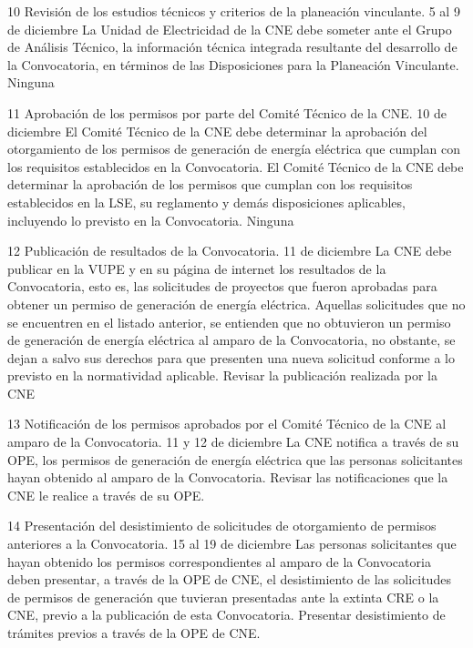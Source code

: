  10
 Revisión de los estudios técnicos y criterios de la planeación vinculante.
 5 al 9 de diciembre
 La Unidad de Electricidad de la CNE debe someter ante el Grupo de Análisis Técnico, la información técnica integrada resultante del desarrollo de la Convocatoria, en términos de las Disposiciones para la Planeación Vinculante.
 Ninguna
 
 \par
11
 Aprobación de los permisos por parte del Comité Técnico de la CNE.
 10 de diciembre
 El Comité Técnico de la CNE debe determinar la aprobación del otorgamiento de los permisos de generación de energía eléctrica que cumplan con los requisitos establecidos en la Convocatoria. El Comité Técnico de la CNE debe determinar la aprobación de los permisos que cumplan con los requisitos establecidos en la LSE, su reglamento y demás disposiciones aplicables, incluyendo lo previsto en la Convocatoria.
 Ninguna
 
 12
 Publicación de resultados de la Convocatoria.
 11 de diciembre
 La CNE debe publicar en la VUPE y en su página de internet los resultados de la Convocatoria, esto es, las solicitudes de proyectos que fueron aprobadas para obtener un permiso de generación de energía eléctrica.
Aquellas solicitudes que no se encuentren en el listado anterior, se entienden que no obtuvieron un permiso de generación de energía eléctrica al amparo de la Convocatoria, no obstante, se dejan a salvo sus derechos para que presenten una nueva solicitud conforme a lo previsto en la normatividad aplicable.
 Revisar la publicación realizada por la CNE
 
 13
 Notificación de los permisos aprobados por el Comité Técnico de la CNE al amparo de la Convocatoria.
 11 y 12 de diciembre
 La CNE notifica a través de su OPE, los permisos de generación de energía eléctrica que las personas solicitantes hayan obtenido al amparo de la Convocatoria.
 Revisar las notificaciones que la CNE le realice a través de su OPE.
 
 14
 Presentación del desistimiento de solicitudes de otorgamiento de permisos anteriores a la Convocatoria.
 15 al 19 de diciembre
 Las personas solicitantes que hayan obtenido los permisos correspondientes al amparo de la Convocatoria deben presentar, a través de la OPE de CNE, el desistimiento de las solicitudes de permisos de generación que tuvieran presentadas ante la extinta CRE o la CNE, previo a la publicación de esta Convocatoria.
 Presentar desistimiento de trámites previos a través de la OPE de CNE.
 

